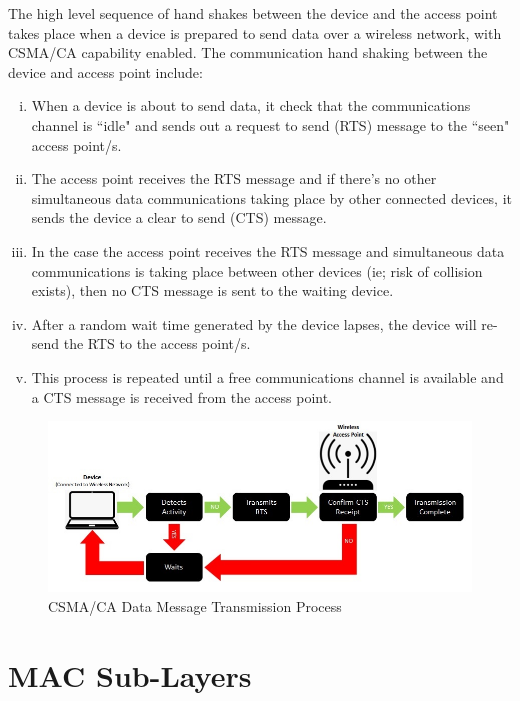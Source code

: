 The high level sequence of hand shakes between the device and the access
point takes place when a device is  prepared to send data over a wireless
network, with CSMA/CA capability enabled. The communication hand shaking
between the device and access point include:

\begin{enumerate}[(i)]

\item When a device is about to send data, it check that the communications 
channel is ``idle" and sends out a request to send (RTS) message to the ``seen" access point/s.
\item The access point receives the RTS message and if there's no other 
simultaneous data communications taking place by other connected devices, 
it sends the device a clear to send (CTS) message.
\item In the case the access point receives the RTS message and simultaneous 
data communications is taking place between other devices (ie; risk of collision 
exists), then no CTS message is sent to the waiting device.
\item After a random wait time generated by the device lapses, the 
device will re-send the RTS to the access point/s.
\item This process is repeated until a free communications channel is 
available and a CTS message is received from the access point.

\end{enumerate}

\begin{figure}
\centering
	\includegraphics[width=12cm]{CSMA_CA.jpg}
	\caption{CSMA/CA Data Message Transmission Process}
	\label{CSMA_CA}
\end{figure}


\section{MAC Sub-Layers}

